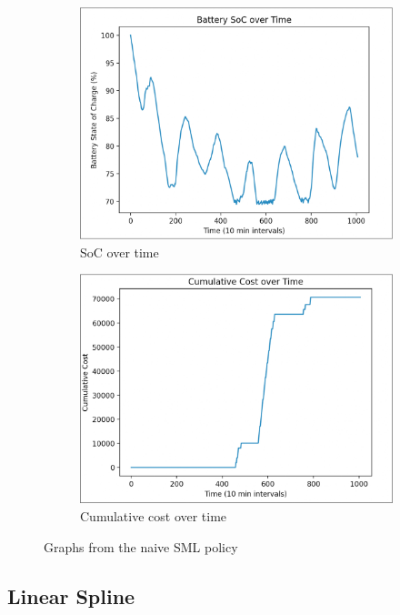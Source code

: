 \documentclass{article}
\begin{document}
\begin{figure}[H]
  \centering
  \begin{subfigure}[b]{0.45\linewidth}
    \includegraphics[width=\linewidth]{pics/naivesocvtime.jpg}
    \caption{SoC over time}
  \end{subfigure}
  \begin{subfigure}[b]{0.45\linewidth}
    \includegraphics[width=\linewidth]{pics/naivecostvtime.jpg}
    \caption{Cumulative cost over time}
  \end{subfigure}
  \caption{Graphs from the naive SML policy}
  \label{fig:naive}
\end{figure}

\subsection{Linear Spline}
\end{document}
